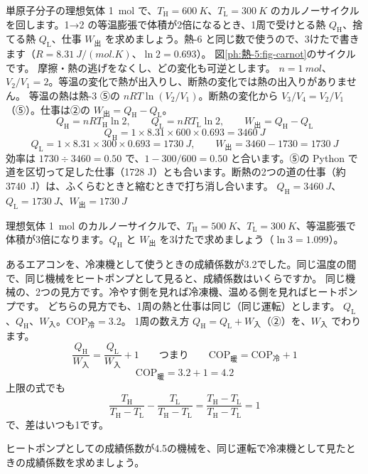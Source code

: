\label{ph:熱-5:ex8}
\begin{phreidai}[理想気体のカルノーサイクルを計算する]
単原子分子の理想気体 \qty{1}{mol} で、$T_{\mathrm H}=\qty{600}{K}$、$T_{\mathrm L}=\qty{300}{K}$ のカルノーサイクルを回します。1→2 の等温膨張で体積が2倍になるとき、1周で受けとる熱 $Q_{\mathrm H}$、捨てる熱 $Q_{\mathrm L}$、仕事 $W_{\text{出}}$ を求めましょう。熱-6 と同じ数で使うので、3けたで書きます（$R=\qty{8.31}{J/(mol.K)}$、$\ln2=0.693$）。
\phbamen
図\ref{ph:熱-5:fig-carnot}のサイクルです。
\phmushi
摩擦・熱の逃げをなくし、どの変化も可逆とします。
\phzu
$n=\qty{1}{mol}$、$V_2/V_1=2$。等温の変化で熱が出入りし、断熱の変化では熱の出入りがありません。
\phriyu
等温の熱は熱-3 ⑤の $nRT\ln(V_2/V_1)$。断熱の変化から $V_3/V_4=V_2/V_1$（⑤）。仕事は②の $W_{\text{出}}=Q_{\mathrm H}-Q_{\mathrm L}$。
\phtateru
\[Q_{\mathrm H}=nRT_{\mathrm H}\ln2,\qquad Q_{\mathrm L}=nRT_{\mathrm L}\ln2,\qquad W_{\text{出}}=Q_{\mathrm H}-Q_{\mathrm L}\]
\phtoku
\[Q_{\mathrm H}=1\times8.31\times600\times0.693=\qty{3460}{J}\]
\[Q_{\mathrm L}=1\times8.31\times300\times0.693=\qty{1730}{J},\qquad W_{\text{出}}=3460-1730=\qty{1730}{J}\]
\phtashikame
効率は $1730\div3460=0.50$ で、$1-300/600=0.50$ と合います。⑤の Python で道を区切って足した仕事（1728 J）とも合います。断熱の2つの道の仕事（約\qty{3740}{J}）は、ふくらむときと縮むときで打ち消し合います。
\kotae $Q_{\mathrm H}=\qty{3460}{J}$、$Q_{\mathrm L}=\qty{1730}{J}$、$W_{\text{出}}=\qty{1730}{J}$
\end{phreidai}
\begin{jibun}
理想気体 \qty{1}{mol} のカルノーサイクルで、$T_{\mathrm H}=\qty{500}{K}$、$T_{\mathrm L}=\qty{300}{K}$、等温膨張で体積が3倍になります。$Q_{\mathrm H}$ と $W_{\text{出}}$ を3けたで求めましょう（$\ln3=1.099$）。
\end{jibun}

\label{ph:熱-5:ex9}
\begin{phreidai}[冷房と暖房の成績係数の関係]
あるエアコンを、冷凍機として使うときの成績係数が3.2でした。同じ温度の間で、同じ機械をヒートポンプとして見ると、成績係数はいくらですか。
\phbamen
同じ機械の、2つの見方です。冷やす側を見れば冷凍機、温める側を見ればヒートポンプです。
\phmushi
どちらの見方でも、1周の熱と仕事は同じ（同じ運転）とします。
\phzu
$Q_{\mathrm L}$、$Q_{\mathrm H}$、$W_{\text{入}}$。$\mathrm{COP}_{\text{冷}}=3.2$。
\phriyu
1周の数え方 $Q_{\mathrm H}=Q_{\mathrm L}+W_{\text{入}}$（②）を、$W_{\text{入}}$ でわります。
\phtateru
\[\frac{Q_{\mathrm H}}{W_{\text{入}}}=\frac{Q_{\mathrm L}}{W_{\text{入}}}+1\qquad\text{つまり}\qquad\mathrm{COP}_{\text{暖}}=\mathrm{COP}_{\text{冷}}+1\]
\phtoku
\[\mathrm{COP}_{\text{暖}}=3.2+1=4.2\]
\phtashikame
上限の式でも
\[ \frac{T_{\mathrm H}}{T_{\mathrm H}-T_{\mathrm L}}-\frac{T_{\mathrm L}}{T_{\mathrm H}-T_{\mathrm L}}=\frac{T_{\mathrm H}-T_{\mathrm L}}{T_{\mathrm H}-T_{\mathrm L}}=1 \]
で、差はいつも1です。
\end{phreidai}
\begin{jibun}
ヒートポンプとしての成績係数が4.5の機械を、同じ運転で冷凍機として見たときの成績係数を求めましょう。
\end{jibun}


